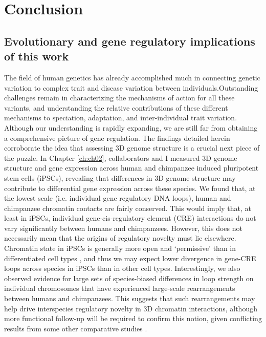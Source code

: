 \chapter{Conclusion}\label{ch:ch04}

\section{Evolutionary and gene regulatory implications of this work}
The field of human genetics has already accomplished much in connecting genetic variation to complex trait and disease variation between individuals.Outstanding challenges remain in characterizing the mechanisms of action for all these variants, and understanding the relative contributions of these different mechanisms to speciation, adaptation, and inter-individual trait variation. Although our understanding is rapidly expanding, we are still far from obtaining a comprehensive picture of gene regulation. The findings detailed herein corroborate the idea that assessing 3D genome structure is a crucial next piece of the puzzle. In Chapter \ref{ch:ch02}, collaborators and I measured 3D genome structure and gene expression across human and chimpanzee induced pluripotent stem cells (iPSCs), revealing that differences in 3D genome structure may contribute to differential gene expression across these species. We found that, at the lowest scale (i.e. individual gene regulatory DNA loops), human and chimpanzee chromatin contacts are fairly conserved. This would imply that, at least in iPSCs, individual gene-cis-regulatory element (CRE) interactions do not vary significantly between humans and chimpanzees. However, this does not necessarily mean that the origins of regulatory novelty must lie elsewhere. Chromatin state in iPSCs is generally more open and `permissive' than in differentiated cell types \cite{Spivakov.2007}, and thus we may expect lower divergence in gene-CRE loops across species in iPSCs than in other cell types. Interestingly, we also observed evidence for large sets of species-biased differences in loop strength on individual chromosomes that have experienced large-scale rearrangements between humans and chimpanzees. This suggests that such rearrangements may help drive interspecies regulatory novelty in 3D chromatin interactions, although more functional follow-up will be required to confirm this notion, given conflicting results from some other comparative studies \cite{Lazar.2018, Krefting.2018}.

